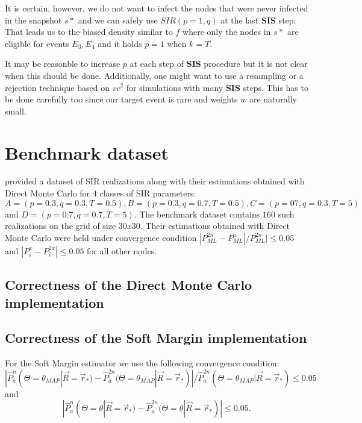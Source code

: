 \documentclass[times, utf8, diplomski]{fer}
\begin{document}
It is certain, however, we do not want to infect the nodes that were never infected in the snapshot $s*$ and we can safely use $SIR(p = 1, q)$ at the last \textbf{SIS} step. That leads us to the biased density similar to $f$ where only the nodes in $s*$ are eligible for events $E_3, E_4$ and it holds $p = 1$ when $k = T$.

It may be reasonble to increase $p$ at each step of \textbf{SIS} procedure but it is not clear when this should be done. Additionally, one might want to use a resampling or a rejection technique based on $vc^2$ for simulations with many  \textbf{SIS} steps. This has to be done carefully too since our target event is rare and weights $w$ are naturally small.



\chapter{Benchmark dataset}

\citet{Nino} provided a dataset of SIR realizations along with their estimations obtained with Direct Monte Carlo for $4$ classes of SIR parameters: $A = (p = 0.3, q = 0.3, T =0 .5), B = (p = 0.3, q = 0.7, T = 0.5), C = (p = 07, q = 0.3, T = 5)$ and  $D = (p = 0.7, q = 0.7, T = 5)$. The benchmark dataset contains $160$ such realizations on the grid of size $30x30$.
 Their estimations obtained with Direct Monte Carlo were held under convergence condition $|P_{ML}^{2n} - P_{ML}^{n}| / P_{ML}^{2n}| \leq 0.05$  and $|P_i^x - P_i^{2x}| \leq 0.05$ for all other nodes. %

\section{Correctness of the Direct Monte Carlo implementation}

\section{Correctness of the Soft Margin implementation}
For the Soft Margin estimator we use the following convergence condition: 
\begin{equation*}
|\hat{P}_a^{n}(\Theta = \theta_{MAP} | \vec{R} = \vec{r}_*) - \hat{P}_a^{2n}(\Theta = \theta_{MAP} | \vec{R} = \vec{r}_*)| / \hat{P}_a^{2n}(\Theta = \theta_{MAP} | \vec{R} = \vec{r}_*) \leq 0.05 
\end{equation*}
and
\begin{equation*}
|\hat{P}_a^{n}(\Theta = \theta | \vec{R} = \vec{r}_*) - \hat{P}_a^{2n}(\Theta = \theta | \vec{R} = \vec{r}_*)| \leq 0.05.
\end{equation*}
\end{document}
